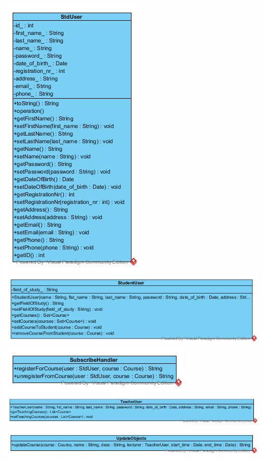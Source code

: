 \documentclass[a4paper,12pt]{article}
\begin{document}
\begin{center}
	\includegraphics[scale=1]{cStdUser.png}
	\includegraphics[scale=1]{cStudentUser.png}
	\includegraphics[scale=1]{cSubscribeHandler.png}
	\includegraphics[scale=.8]{cTeacherUser.png}
	\includegraphics[scale=.9]{cUpdateObjects.png}
\end{center}
\newpage
\end{document}

